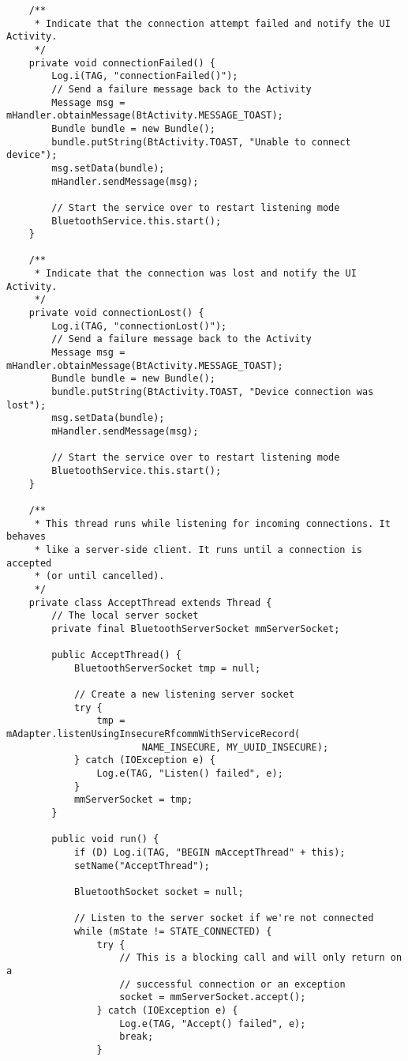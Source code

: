 \begin{verbatim}
    /**
     * Indicate that the connection attempt failed and notify the UI Activity.
     */
    private void connectionFailed() {
        Log.i(TAG, "connectionFailed()");
        // Send a failure message back to the Activity
        Message msg = mHandler.obtainMessage(BtActivity.MESSAGE_TOAST);
        Bundle bundle = new Bundle();
        bundle.putString(BtActivity.TOAST, "Unable to connect device");
        msg.setData(bundle);
        mHandler.sendMessage(msg);

        // Start the service over to restart listening mode
        BluetoothService.this.start();
    }

    /**
     * Indicate that the connection was lost and notify the UI Activity.
     */
    private void connectionLost() {
        Log.i(TAG, "connectionLost()");
        // Send a failure message back to the Activity
        Message msg = mHandler.obtainMessage(BtActivity.MESSAGE_TOAST);
        Bundle bundle = new Bundle();
        bundle.putString(BtActivity.TOAST, "Device connection was lost");
        msg.setData(bundle);
        mHandler.sendMessage(msg);

        // Start the service over to restart listening mode
        BluetoothService.this.start();
    }

    /**
     * This thread runs while listening for incoming connections. It behaves
     * like a server-side client. It runs until a connection is accepted
     * (or until cancelled).
     */
    private class AcceptThread extends Thread {
        // The local server socket
        private final BluetoothServerSocket mmServerSocket;

        public AcceptThread() {
            BluetoothServerSocket tmp = null;

            // Create a new listening server socket
            try {
                tmp = mAdapter.listenUsingInsecureRfcommWithServiceRecord(
                        NAME_INSECURE, MY_UUID_INSECURE);
            } catch (IOException e) {
                Log.e(TAG, "Listen() failed", e);
            }
            mmServerSocket = tmp;
        }

        public void run() {
            if (D) Log.i(TAG, "BEGIN mAcceptThread" + this);
            setName("AcceptThread");

            BluetoothSocket socket = null;

            // Listen to the server socket if we're not connected
            while (mState != STATE_CONNECTED) {
                try {
                    // This is a blocking call and will only return on a
                    // successful connection or an exception
                    socket = mmServerSocket.accept();
                } catch (IOException e) {
                    Log.e(TAG, "Accept() failed", e);
                    break;
                }


\end{verbatim}
